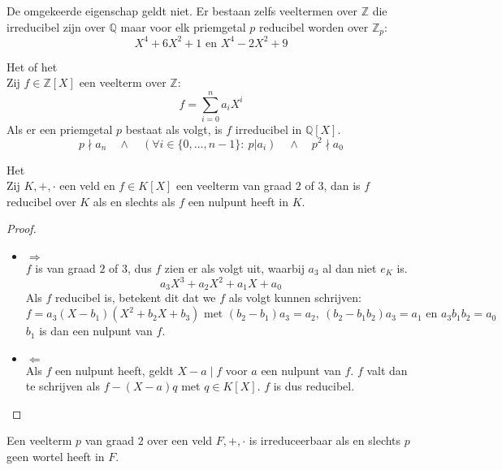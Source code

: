 \documentclass[main.tex]{subfiles}
\begin{document}
\begin{opm}
  De omgekeerde eigenschap geldt niet.
  Er bestaan zelfs veeltermen over $\mathbb{Z}$ die irreducibel zijn over $\mathbb{Q}$ maar voor elk priemgetal $p$ reducibel worden over $\mathbb{Z}_{p}$:
  \[ X^{4}+ 6X^{2}+1 \text{ en } X^{4} -2X^{2} + 9 \]
\end{opm}

\begin{ei}
  Het  of het \\
  Zij $f\in \mathbb{Z}[X]$ een veelterm over $\mathbb{Z}$:
  \[ f = \sum_{i=0}^{n}a_{i}X^{i}\]
  Als er een priemgetal $p$ bestaat als volgt, is $f$ irreducibel in $\mathbb{Q}[X]$.
  \[ p \nmid a_{n} \quad\wedge\quad (\forall i \in \{0,\dotsc,n-1\}:\ p |a_{i}) \quad\wedge\quad p^{2} \nmid a_{0} \]
\end{ei}

\begin{ei}
  Het \\
  Zij $K,+,\cdot$ een veld en $f\in K[X]$ een veelterm van graad $2$ of $3$, dan is $f$ reducibel over $K$ als en slechts als $f$ een nulpunt heeft in $K$.

  \begin{proof}
    \begin{itemize}
    \item $\Rightarrow$\\
      $f$ is van graad $2$ of $3$, dus $f$ zien er als volgt uit, waarbij $a_{3}$ al dan niet $e_{K}$ is.
      \[ a_{3}X^{3}+a_{2}X^{2}+a_{1}X+a_{0} \]
      Als $f$ reducibel is, betekent dit dat we $f$ als volgt kunnen schrijven:
      \[ f = a_{3}(X-b_{1})(X^{2} + b_{2}X + b_{3}) \text{ met } (b_{2}-b_{1})a_{3} = a_{2},\ (b_{2}-b_{1}b_{2})a_{3} = a_{1}\text{ en } a_{3}b_{1}b_{2}= a_{0} \]
      $b_{1}$ is dan een nulpunt van $f$.
    \item $\Leftarrow$\\
      Als $f$ een nulpunt heeft, geldt $X-a \mid f$  voor $a$ een nulpunt van $f$.
      $f$ valt dan te schrijven als $f-(X-a)q$ met $q\in K[X]$.
      $f$ is dus reducibel.
    \end{itemize}
  \end{proof}
\end{ei}

\begin{st}
  Een veelterm $p$ van graad $2$ over een veld $F,+,\cdot$ is irreduceerbaar als en slechts $p$ geen wortel heeft in $F$.
\end{st}
\end{document}
